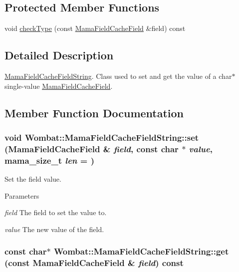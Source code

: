 \subsection*{Protected Member Functions}
\begin{DoxyCompactItemize}
\item 
void \hyperlink{classWombat_1_1MamaFieldCacheFieldString_a02461a9b591cea2aee32ea591a18d04a}{checkType} (const \hyperlink{classWombat_1_1MamaFieldCacheField}{MamaFieldCacheField} \&field) const 
\end{DoxyCompactItemize}


\subsection{Detailed Description}
\hyperlink{classWombat_1_1MamaFieldCacheFieldString}{MamaFieldCacheFieldString}. Class used to set and get the value of a char$\ast$ single-\/value {\ttfamily \hyperlink{classWombat_1_1MamaFieldCacheField}{MamaFieldCacheField}}. 

\subsection{Member Function Documentation}
\hypertarget{classWombat_1_1MamaFieldCacheFieldString_a2272ccc85a4c5abbd705b77e8333e79b}{
\subsubsection[{set}]{\setlength{\rightskip}{0pt plus 5cm}void Wombat::MamaFieldCacheFieldString::set ({\bf MamaFieldCacheField} \& {\em field}, \/  const char $\ast$ {\em value}, \/  {\bf mama\_\-size\_\-t} {\em len} = {})}}
\label{classWombat_1_1MamaFieldCacheFieldString_a2272ccc85a4c5abbd705b77e8333e79b}


Set the field value. 
\begin{DoxyParams}{Parameters}
\item[{\em field}]The field to set the value to. \item[{\em value}]The new value of the field. \end{DoxyParams}
\hypertarget{classWombat_1_1MamaFieldCacheFieldString_ab803ba919dab54906b2baedaf656a05a}{
\subsubsection[{get}]{\setlength{\rightskip}{0pt plus 5cm}const char$\ast$ Wombat::MamaFieldCacheFieldString::get (const {\bf MamaFieldCacheField} \& {\em field}) const}}
\label{classWombat_1_1MamaFieldCacheFieldString_ab803ba919dab54906b2baedaf656a05a}


